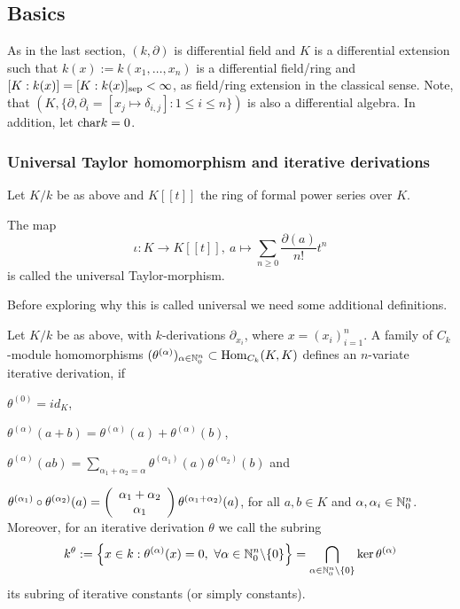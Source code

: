 \subsection{Basics}
As in the last section, $(k,\partial)$ is differential field and $K$ is a differential extension such that $k(x) := k(x_1,\ldots,x_n)$ is a differential field/ring and $[K:k(x)] = [K:k(x)]_{\trm{sep}} < \infty$, as field/ring extension in the classical sense. Note, that $(K, \{\partial, \partial_i = [x_j \longmapsto \delta_{i,j}] : 1 \leq i \leq n\})$ is also a differential algebra. In addition, let $\trm{char} k = 0$.
\subsubsection{Universal Taylor homomorphism and iterative derivations}
Let $K/k$ be as above and $K[[t]]$ the ring of formal power series over $K$.
\begin{defi}
The map
$$\iota : K \longrightarrow K[[t]],\ a \longmapsto \sum_{n \geq 0} \frac{\partial(a)}{n!} t^n$$
is called the universal Taylor-morphism.
\end{defi}
Before exploring why this is called universal we need some additional definitions.
\begin{defi}
Let $K/k$ be as above, %
with $k$-derivations $\partial_{x_i}$, where $x = (x_i)_{i=1}^n$. A family of $C_k$-module homomorphisms $(\theta^{(\alpha)})_{\alpha \in \nz_0^n} \subset \trm{Hom}_{C_k}(K,K)$ defines an $n$-variate iterative derivation, if
\bn
\item $\theta^{(0)} = id_K$,
\item $\theta^{(\alpha)}(a + b) = \theta^{(\alpha)}(a) + \theta^{(\alpha)}(b)$,
\item $\theta^{(\alpha)} (a b) = \sum_{\alpha_1 + \alpha_2 = \alpha} \theta^{(\alpha_1)} (a) \theta^{(\alpha_2)} (b)$ and
\item $\theta^{(\alpha_1)} \circ \theta^{(\alpha_2)}(a) = \left(\bao{c}
\alpha_1 + \alpha_2\\
\alpha_1\\
\ea\right) \theta^{(\alpha_1 + \alpha_2)} (a)$,
\en
for all $a, b \in K$ and $\alpha, \alpha_i \in \nz_0^n$. Moreover, for an iterative derivation $\theta$ we call the subring
$$k^\theta := \left\{x \in k : \theta^{(\alpha)}(x) = 0,\ \forall \alpha \in \nz_0^n\bsl \{0\}\right\} = \bigcap_{\alpha \in \nz_0^n \bsl \{0\}} \ker \theta^{(\alpha)}$$
its subring of iterative constants (or simply constants).
\end{defi}
